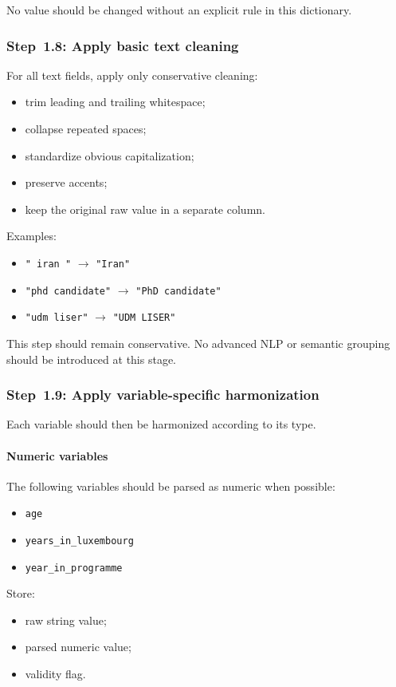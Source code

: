 \documentclass[11pt]{article}
\begin{document}
No value should be changed without an explicit rule in this dictionary.

\subsubsection{Step~1.8: Apply basic text cleaning}
For all text fields, apply only conservative cleaning:
\begin{itemize}
    \item trim leading and trailing whitespace;
    \item collapse repeated spaces;
    \item standardize obvious capitalization;
    \item preserve accents;
    \item keep the original raw value in a separate column.
\end{itemize}

Examples:
\begin{itemize}
    \item \texttt{" iran "} $\rightarrow$ \texttt{"Iran"}
    \item \texttt{"phd candidate"} $\rightarrow$ \texttt{"PhD candidate"}
    \item \texttt{"udm liser"} $\rightarrow$ \texttt{"UDM LISER"}
\end{itemize}

This step should remain conservative.
No advanced NLP or semantic grouping should be introduced at this stage.

\subsubsection{Step~1.9: Apply variable-specific harmonization}
Each variable should then be harmonized according to its type.

\paragraph{Numeric variables}
The following variables should be parsed as numeric when possible:
\begin{itemize}
    \item \texttt{age}
    \item \texttt{years\_in\_luxembourg}
    \item \texttt{year\_in\_programme}
\end{itemize}

Store:
\begin{itemize}
    \item raw string value;
    \item parsed numeric value;
    \item validity flag.
\end{itemize}
\end{document}

